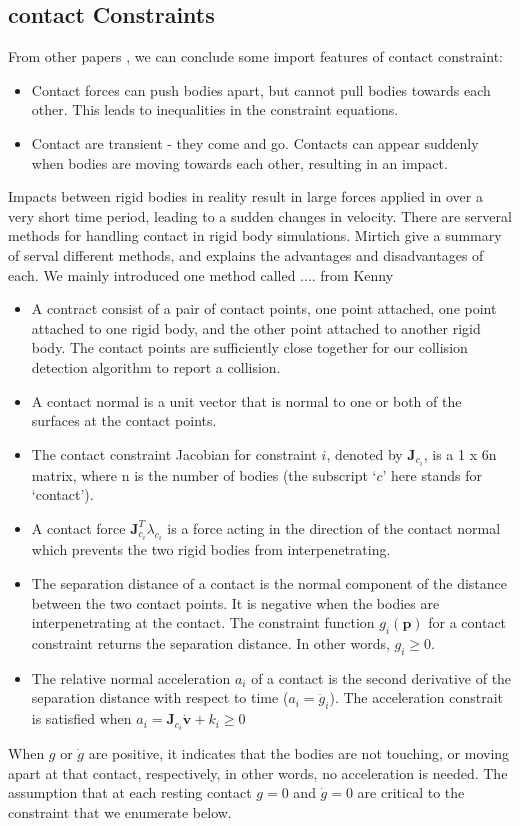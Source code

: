     \subsection{contact Constraints}
        From other papers \cite{bender2014interactive}, we can conclude some import features of contact constraint:
        \begin{itemize}
            \item Contact forces can push bodies apart, but cannot pull bodies towards each other. This leads to inequalities in the constraint equations.
            \item Contact are transient - they come and go. Contacts can appear suddenly when bodies are moving towards each other, resulting in an impact.
        \end{itemize}
        Impacts between rigid bodies in reality result in large forces applied in over a very short time period, leading to a sudden changes in velocity. There are serveral methods for handling contact in rigid body simulations. Mirtich\cite{mirtich1998rigid} give a summary of serval different methods, and explains the advantages and disadvantages of each. We mainly introduced one  method called .... from Kenny\cite{erleben2017rigid}
        \begin{itemize}
            \item A contract consist of a pair of contact points, one point attached, one point attached to one rigid body, and the other point attached to another rigid body. The contact points are sufficiently close together for our collision detection algorithm to report a collision.
            \item A contact normal is a unit vector that is normal to one or both of the surfaces at the contact points.
            \item The contact constraint Jacobian for constraint $i$, denoted by $\pmb{J}_{c_i}$, is a 1 x 6n matrix, where n is the number of bodies (the subscript `$c$' here stands for `contact').
            \item A contact force $\pmb{J}_{c_i}^{T}\lambda _{c_i}$ is a force acting in the direction of the contact normal which prevents the two rigid bodies from interpenetrating.
            \item The separation distance of a contact is the normal component of the distance between the two contact points. It is negative when the bodies are interpenetrating at the contact. The constraint function $g_{i}(\pmb{p})$ for a contact constraint returns the separation distance. In other words, $g_i \ge 0$.
            \item The relative normal acceleration $a_i$ of a contact is the second derivative of the separation distance with respect to time ($a_i = \ddot{g}_i$). The acceleration constrait is satisfied when $a_i = \pmb{J}_{c_i} \dot{\mathbf{v}}+ k_i \ge 0$
        \end{itemize}
        When $g$ or $\dot{g}$ are positive, it indicates that the bodies are not touching, or moving apart at that contact, respectively, in other words, no acceleration is needed. The assumption that at each resting contact $g = 0$ and $\dot{g} = 0 $ are critical to the constraint that we enumerate below.\\

